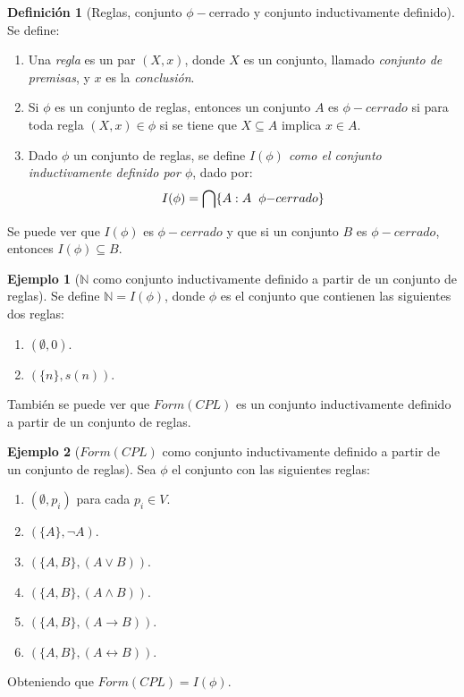 \documentclass[11pt,oneside]{report}
\theoremstyle{plain}
\theoremstyle{definition}
\newtheorem{defi}{Definición}[chapter]
\newtheorem{ejemplo}{Ejemplo}[chapter]
\newcommand{\N}{\mathbb{N}}
\begin{document}
\begin{defi}[Reglas, conjunto $\phi-$cerrado y conjunto inductivamente definido]
    Se define:
    \begin{enumerate}
        \item Una \emph{regla} es un par $(X,x)$, donde $X$ es un conjunto, llamado \emph{conjunto de premisas}, y $x$ es la \emph{conclusión}.
        \item Si $\phi$ es un conjunto de reglas, entonces un conjunto $A$ es \emph{$\phi - cerrado$} si para toda regla $(X,x) \in \phi$ si se tiene que $X \subseteq A$ implica $x \in A$.
        \item Dado $\phi$ un conjunto de reglas, se define \emph{$I(\phi)$ como el conjunto inductivamente definido por $\phi$}, dado por:
              $$I(\phi) = \bigcap \{A : A \hspace{2mm}\phi{-cerrado}\}$$
    \end{enumerate}
\end{defi}
Se puede ver que $I(\phi)$ es $\phi -cerrado$ y que si un conjunto $B$ es $\phi -cerrado$, entonces $I(\phi) \subseteq B$.
\begin{ejemplo}[$\N$ como conjunto inductivamente definido a partir de un conjunto de reglas]
    Se define $\N = I(\phi)$, donde $\phi$ es el conjunto que contienen las siguientes dos reglas:
    \begin{enumerate}
        \item $(\emptyset,0)$.
        \item $(\{n\},s(n))$.
    \end{enumerate}
\end{ejemplo}

También se puede ver que $Form(CPL)$ es un conjunto inductivamente definido a partir de un conjunto de reglas.
\begin{ejemplo}[$Form(CPL)$ como conjunto inductivamente definido a partir de un conjunto de reglas]
    Sea $\phi$ el conjunto con las siguientes reglas:
    \begin{enumerate}
        \item $(\emptyset, p_i)$ para cada $p_i \in V$.
        \item $(\{A\}, \neg A)$.
        \item $(\{A, B\}, (A \lor B))$.
        \item $(\{A, B\}, (A \land B))$.
        \item $(\{A, B\}, (A \rightarrow B))$.
        \item $(\{A, B\}, (A \leftrightarrow B))$.
    \end{enumerate}
    Obteniendo que $Form(CPL) = I(\phi)$.
\end{ejemplo}
\end{document}
